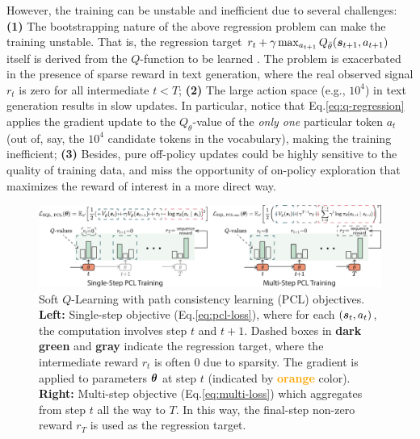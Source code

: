 However, the training can be unstable and inefficient due to several challenges: 
{\bf (1)} The bootstrapping nature of the above regression problem can make the training unstable. That is, the regression target $r_t + \gamma \max_{a_{t+1}} Q_{\bar{\theta}}(\bm{s}_{t+1}, a_{t+1})$ itself is derived from the $Q$-function to be learned \citep{kumar2019stabilizing}. The problem is exacerbated in the presence of sparse reward in text generation, where the real observed signal $r_t$ is zero for all intermediate $t<T$; 
{\bf (2)} The large action space (e.g., $10^4$) in text generation results in slow updates. In particular, notice that Eq.\eqref{eq:q-regression} applies the gradient update to the $Q_{{\theta}}$-value of the \emph{only one} particular token $a_t$ (out of, say, the $10^4$ candidate tokens in the vocabulary), making the training inefficient;
{\bf (3)} Besides, pure off-policy updates could be highly sensitive to the quality of training data, and miss the opportunity of on-policy exploration that maximizes the reward of interest in a more direct way.



\begin{figure}
    \centering
    \includegraphics[width=0.99\linewidth]{figures/soft-q-learning.pdf}
    \vspace{-4pt}
    \caption{
    Soft $Q$-Learning with path consistency learning (PCL) objectives.
    {\bf Left:} Single-step objective (Eq.\ref{eq:pcl-loss}), where for each $(\bm{s}_t, a_t)$, the computation involves step $t$ and $t+1$. Dashed boxes in \textcolor[HTML]{3A6B73}{\textbf{dark green}} and \textcolor[HTML]{808285}{\textbf{gray}} indicate the regression target, where the intermediate reward $r_t$ is often 0 due to sparsity. The gradient is applied to parameters $\bm{\theta}$ at step $t$ (indicated by {\textcolor{orange}{\textbf{orange}}} color). {\bf Right:} Multi-step objective (Eq.\ref{eq:multi-loss}) which aggregates from step $t$ all the way to $T$. In this way, the final-step non-zero reward $r_T$ is used as the regression target.
    }
    \vspace{-4pt}
    \label{fig:soft-q-learning-pcl}
\end{figure}



